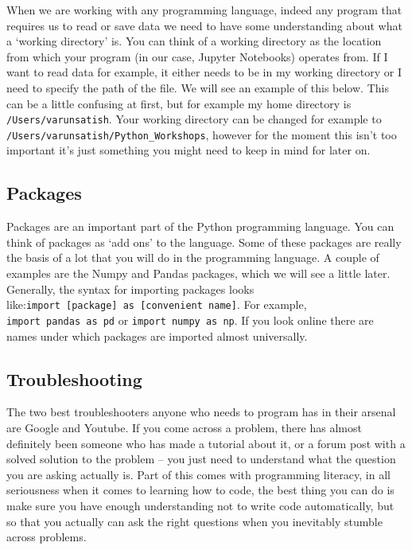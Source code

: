 \documentclass[11pt]{article}
\begin{document}
When we are working with any programming language, indeed any program
that requires us to read or save data we need to have some understanding
about what a `working directory' is. You can think of a working
directory as the location from which your program (in our case, Jupyter
Notebooks) operates from. If I want to read data for example, it either
needs to be in my working directory or I need to specify the path of the
file. We will see an example of this below. This can be a little
confusing at first, but for example my home directory is
\texttt{/Users/varunsatish}. Your working directory can be changed for
example to \texttt{/Users/varunsatish/Python\_Workshops}, however for
the moment this isn't too important it's just something you might need
to keep in mind for later on.

\hypertarget{packages}{%
\subsection{Packages}\label{packages}}

Packages are an important part of the Python programming language. You
can think of packages as `add ons' to the language. Some of these
packages are really the basis of a lot that you will do in the
programming language. A couple of examples are the Numpy and Pandas
packages, which we will see a little later. Generally, the syntax for
importing packages looks
like:\texttt{import\ {[}package{]}\ as\ {[}convenient\ name{]}}. For
example, \texttt{import\ pandas\ as\ pd} or
\texttt{import\ numpy\ as\ np}. If you look online there are names under
which packages are imported almost universally.

\hypertarget{troubleshooting}{%
\subsection{Troubleshooting}\label{troubleshooting}}

The two best troubleshooters anyone who needs to program has in their
arsenal are Google and Youtube. If you come across a problem, there has
almost definitely been someone who has made a tutorial about it, or a
forum post with a solved solution to the problem -- you just need to
understand what the question you are asking actually is. Part of this
comes with programming literacy, in all seriousness when it comes to
learning how to code, the best thing you can do is make sure you have
enough understanding not to write code automatically, but so that you
actually can ask the right questions when you inevitably stumble across
problems.
\end{document}
